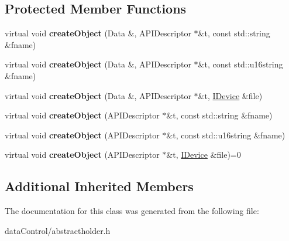 \subsection*{Protected Member Functions}
\begin{DoxyCompactItemize}
\item 
\hypertarget{class_tempest_1_1_abstract_holder_with_load_aa3241b750aea46fee5c05c83aad62833}{virtual void {\bfseries create\+Object} (Data \&, A\+P\+I\+Descriptor $\ast$\&t, const std\+::string \&fname)}\label{class_tempest_1_1_abstract_holder_with_load_aa3241b750aea46fee5c05c83aad62833}

\item 
\hypertarget{class_tempest_1_1_abstract_holder_with_load_a366d654c361bd8618ba7f9a07efbcb08}{virtual void {\bfseries create\+Object} (Data \&, A\+P\+I\+Descriptor $\ast$\&t, const std\+::u16string \&fname)}\label{class_tempest_1_1_abstract_holder_with_load_a366d654c361bd8618ba7f9a07efbcb08}

\item 
\hypertarget{class_tempest_1_1_abstract_holder_with_load_a57bbc7ddd024c9669c054058774e00b4}{virtual void {\bfseries create\+Object} (Data \&, A\+P\+I\+Descriptor $\ast$\&t, \hyperlink{class_tempest_1_1_i_device}{I\+Device} \&file)}\label{class_tempest_1_1_abstract_holder_with_load_a57bbc7ddd024c9669c054058774e00b4}

\item 
\hypertarget{class_tempest_1_1_abstract_holder_with_load_ae8fc90320d0beba4724e111c3d9715ac}{virtual void {\bfseries create\+Object} (A\+P\+I\+Descriptor $\ast$\&t, const std\+::string \&fname)}\label{class_tempest_1_1_abstract_holder_with_load_ae8fc90320d0beba4724e111c3d9715ac}

\item 
\hypertarget{class_tempest_1_1_abstract_holder_with_load_a6e924e57b4089d480b35e69920851ccb}{virtual void {\bfseries create\+Object} (A\+P\+I\+Descriptor $\ast$\&t, const std\+::u16string \&fname)}\label{class_tempest_1_1_abstract_holder_with_load_a6e924e57b4089d480b35e69920851ccb}

\item 
\hypertarget{class_tempest_1_1_abstract_holder_with_load_a70a851d9ca7d2598e2c1658190772b12}{virtual void {\bfseries create\+Object} (A\+P\+I\+Descriptor $\ast$\&t, \hyperlink{class_tempest_1_1_i_device}{I\+Device} \&file)=0}\label{class_tempest_1_1_abstract_holder_with_load_a70a851d9ca7d2598e2c1658190772b12}

\end{DoxyCompactItemize}
\subsection*{Additional Inherited Members}


The documentation for this class was generated from the following file\+:\begin{DoxyCompactItemize}
\item 
data\+Control/abstractholder.\+h\end{DoxyCompactItemize}
